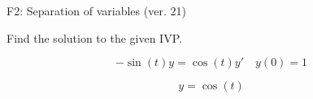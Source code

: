 \begin{exercise}
  \begin{exerciseTitle}F2: Separation of variables (ver. 21)\end{exerciseTitle}
  \begin{exerciseStatement}
    
Find the solution to the given IVP.

    
\[-\sin\left(t\right) y= \cos\left(t\right) y'\hspace{1em} y\left( 0 \right)= 1\]

  \end{exerciseStatement}
  \begin{exerciseAnswer}
    
\[y= \cos\left(t\right)\]

  \end{exerciseAnswer}
\end{exercise}